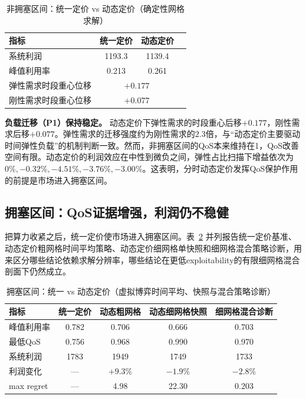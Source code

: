 \documentclass[UTF8,11pt]{ctexart}
\begin{document}
\begin{table}[H]
\centering
\caption{非拥塞区间：统一定价 vs 动态定价（确定性网格求解）}
\label{tab:uncongested}
\begin{tabular}{lccc}
\toprule
指标 & 统一定价 & 动态定价 \\
\midrule
系统利润 & 1193.3 & 1139.4 \\
峰值利用率 & 0.213 & 0.261 \\
弹性需求时段重心位移 & \multicolumn{2}{c}{$+0.177$} \\
刚性需求时段重心位移 & \multicolumn{2}{c}{$+0.077$} \\
\bottomrule
\end{tabular}
\end{table}

\textbf{负载迁移（P1）保持稳定。} 动态定价下弹性需求的时段重心后移$+0.177$，刚性需求后移$+0.077$。弹性需求的迁移强度约为刚性需求的$2.3$倍，与“动态定价主要驱动时间弹性负载”的机制判断一致。然而，非拥塞区间的QoS本来维持在1，QoS改善空间有限。动态定价的利润效应在中性到微负之间，弹性占比扫描下增益依次为$0\%,-0.32\%,-4.51\%,-3.76\%,-3.00\%$。这表明，分时动态定价发挥QoS保护作用的前提是市场进入拥塞区间。

\subsection{拥塞区间：QoS证据增强，利润仍不稳健}

把算力收紧之后，统一定价使市场进入拥塞区间。表~\ref{tab:congested} 并列报告统一定价基准、动态定价粗网格时间平均策略、动态定价细网格单快照和细网格混合策略诊断，用来区分哪些结论依赖求解分辨率，哪些结论在更低exploitability的有限细网格混合剖面下仍然成立。

\begin{table}[H]
\centering
\caption{拥塞区间：统一 vs 动态定价（虚拟博弈时间平均、快照与混合策略诊断）}
\label{tab:congested}
\small
\begin{tabular}{lcccc}
\toprule
指标 & 统一定价 & 动态粗网格 & 动态细网格快照 & 细网格混合诊断 \\
\midrule
峰值利用率 & 0.782 & 0.706 & 0.666 & 0.703 \\
最低QoS & 0.756 & 0.968 & 0.990 & 0.970 \\
系统利润 & 1783 & 1949 & 1749 & 1733 \\
利润变化 & --- & $+9.3\%$ & $-1.9\%$ & $-2.8\%$ \\
max regret & --- & 4.98 & 22.30 & 0.203 \\
\bottomrule
\end{tabular}
\end{table}
\end{document}

